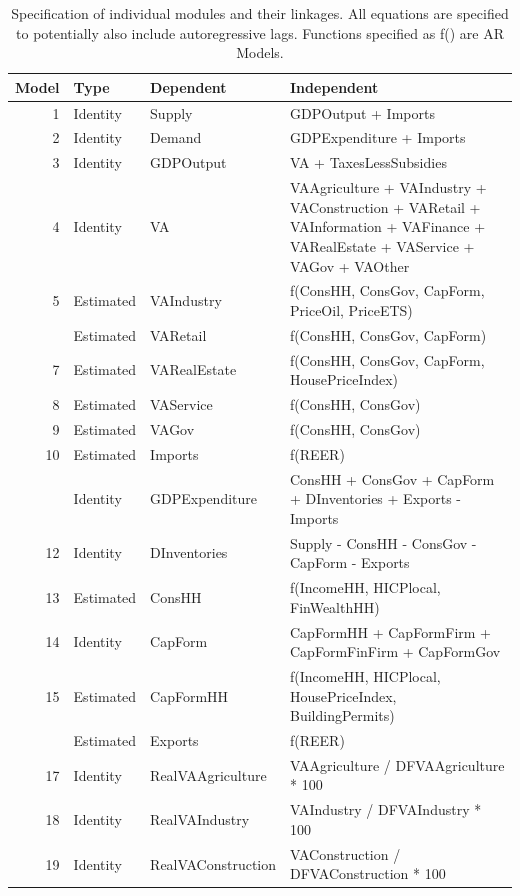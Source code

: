 \begin{table}
\centering\centering
\caption{\label{tab:spec_full}Specification of individual modules and their linkages. All equations are specified to potentially also include autoregressive lags. Functions specified as f() are AR Models.}
\centering
\fontsize{8}{10}\selectfont
\begin{tabular}[t]{rll>{\raggedright\arraybackslash}p{10cm}}
\toprule
Model & Type & Dependent & Independent\\
\midrule
1 & Identity & Supply & GDPOutput + Imports\\
2 & Identity & Demand & GDPExpenditure + Imports\\
3 & Identity & GDPOutput & VA + TaxesLessSubsidies\\
4 & Identity & VA & VAAgriculture + VAIndustry + VAConstruction + VARetail + VAInformation + VAFinance + VARealEstate + VAService + VAGov + VAOther\\
5 & Estimated & VAIndustry & f(ConsHH, ConsGov, CapForm, PriceOil, PriceETS)\\
\addlinespace
6 & Estimated & VARetail & f(ConsHH, ConsGov, CapForm)\\
7 & Estimated & VARealEstate & f(ConsHH, ConsGov, CapForm, HousePriceIndex)\\
8 & Estimated & VAService & f(ConsHH, ConsGov)\\
9 & Estimated & VAGov & f(ConsHH, ConsGov)\\
10 & Estimated & Imports & f(REER)\\
\addlinespace
11 & Identity & GDPExpenditure & ConsHH + ConsGov + CapForm + DInventories + Exports - Imports\\
12 & Identity & DInventories & Supply - ConsHH - ConsGov - CapForm - Exports\\
13 & Estimated & ConsHH & f(IncomeHH, HICPlocal, FinWealthHH)\\
14 & Identity & CapForm & CapFormHH + CapFormFirm + CapFormFinFirm + CapFormGov\\
15 & Estimated & CapFormHH & f(IncomeHH, HICPlocal, HousePriceIndex, BuildingPermits)\\
\addlinespace
16 & Estimated & Exports & f(REER)\\
17 & Identity & RealVAAgriculture & VAAgriculture / DFVAAgriculture * 100\\
18 & Identity & RealVAIndustry & VAIndustry / DFVAIndustry * 100\\
19 & Identity & RealVAConstruction & VAConstruction / DFVAConstruction * 100\\

\end{tabular}
\end{table}
